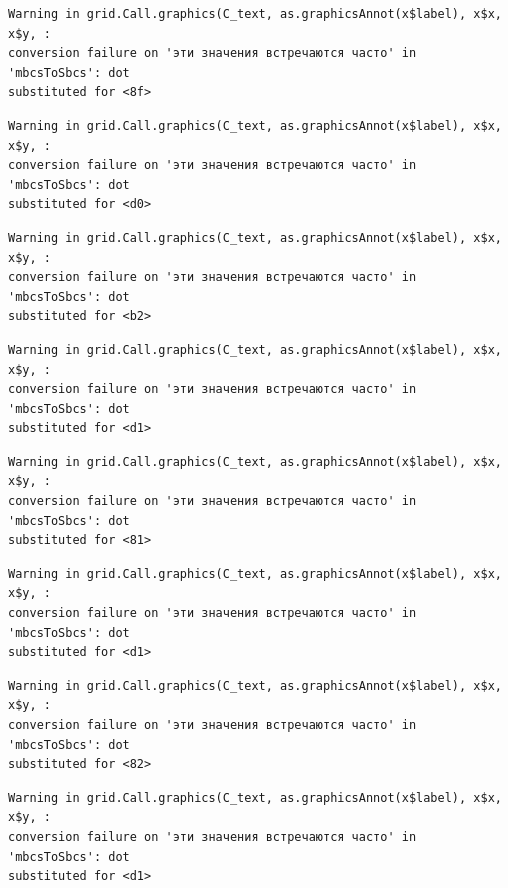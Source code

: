 \documentclass[
  letterpaper,
]{scrbook}
\theoremstyle{definition}
\theoremstyle{remark}
\begin{document}
\begin{verbatim}
Warning in grid.Call.graphics(C_text, as.graphicsAnnot(x$label), x$x, x$y, :
conversion failure on 'эти значения встречаются часто' in 'mbcsToSbcs': dot
substituted for <8f>
\end{verbatim}

\begin{verbatim}
Warning in grid.Call.graphics(C_text, as.graphicsAnnot(x$label), x$x, x$y, :
conversion failure on 'эти значения встречаются часто' in 'mbcsToSbcs': dot
substituted for <d0>
\end{verbatim}

\begin{verbatim}
Warning in grid.Call.graphics(C_text, as.graphicsAnnot(x$label), x$x, x$y, :
conversion failure on 'эти значения встречаются часто' in 'mbcsToSbcs': dot
substituted for <b2>
\end{verbatim}

\begin{verbatim}
Warning in grid.Call.graphics(C_text, as.graphicsAnnot(x$label), x$x, x$y, :
conversion failure on 'эти значения встречаются часто' in 'mbcsToSbcs': dot
substituted for <d1>
\end{verbatim}

\begin{verbatim}
Warning in grid.Call.graphics(C_text, as.graphicsAnnot(x$label), x$x, x$y, :
conversion failure on 'эти значения встречаются часто' in 'mbcsToSbcs': dot
substituted for <81>
\end{verbatim}

\begin{verbatim}
Warning in grid.Call.graphics(C_text, as.graphicsAnnot(x$label), x$x, x$y, :
conversion failure on 'эти значения встречаются часто' in 'mbcsToSbcs': dot
substituted for <d1>
\end{verbatim}

\begin{verbatim}
Warning in grid.Call.graphics(C_text, as.graphicsAnnot(x$label), x$x, x$y, :
conversion failure on 'эти значения встречаются часто' in 'mbcsToSbcs': dot
substituted for <82>
\end{verbatim}

\begin{verbatim}
Warning in grid.Call.graphics(C_text, as.graphicsAnnot(x$label), x$x, x$y, :
conversion failure on 'эти значения встречаются часто' in 'mbcsToSbcs': dot
substituted for <d1>
\end{verbatim}
\end{document}
